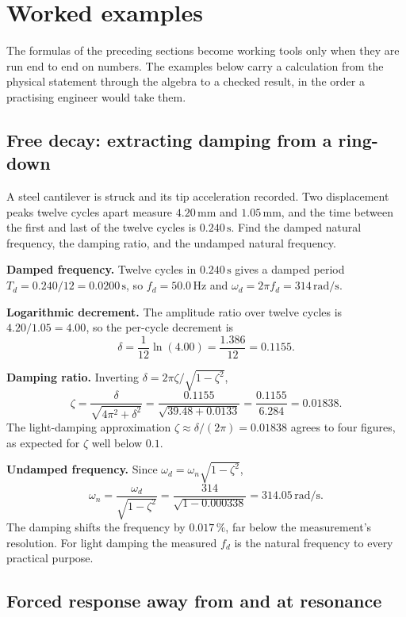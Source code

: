 \section{Worked examples}

The formulas of the preceding sections become working tools only when
they are run end to end on numbers. The examples below carry a
calculation from the physical statement through the algebra to a
checked result, in the order a practising engineer would take them.

\subsection{Free decay: extracting damping from a ring-down}

A steel cantilever is struck and its tip acceleration recorded. Two
displacement peaks twelve cycles apart measure $4.20\,\si{\milli
\meter}$ and $1.05\,\si{\milli\meter}$, and the time between the first
and last of the twelve cycles is $0.240\,\si{\second}$. Find the
damped natural frequency, the damping ratio, and the undamped natural
frequency.

\textbf{Damped frequency.} Twelve cycles in $0.240\,\si{\second}$
gives a damped period $T_d = 0.240/12 = 0.0200\,\si{\second}$, so
$f_d = 50.0\,\si{\hertz}$ and $\omega_d = 2\pi f_d = 314\,\si{\radian
\per\second}$.

\textbf{Logarithmic decrement.} The amplitude ratio over twelve
cycles is $4.20/1.05 = 4.00$, so the per-cycle decrement is
\[
\delta = \frac{1}{12}\ln(4.00) = \frac{1.386}{12} = 0.1155.
\]

\textbf{Damping ratio.} Inverting $\delta = 2\pi\zeta/\sqrt{1-\zeta^2}$,
\[
\zeta = \frac{\delta}{\sqrt{4\pi^2 + \delta^2}} = \frac{0.1155}{\sqrt{
39.48 + 0.0133}} = \frac{0.1155}{6.284} = 0.01838.
\]
The light-damping approximation $\zeta \approx \delta/(2\pi) =
0.01838$ agrees to four figures, as expected for $\zeta$ well below
$0.1$.

\textbf{Undamped frequency.} Since $\omega_d = \omega_n\sqrt{1 -
\zeta^2}$,
\[
\omega_n = \frac{\omega_d}{\sqrt{1 - \zeta^2}} = \frac{314}{\sqrt{1 -
0.000338}} = 314.05\,\si{\radian\per\second}.
\]
The damping shifts the frequency by $0.017\,\%$, far below the
measurement's resolution. For light damping the measured $f_d$ is the
natural frequency to every practical purpose.

\subsection{Forced response away from and at resonance}

